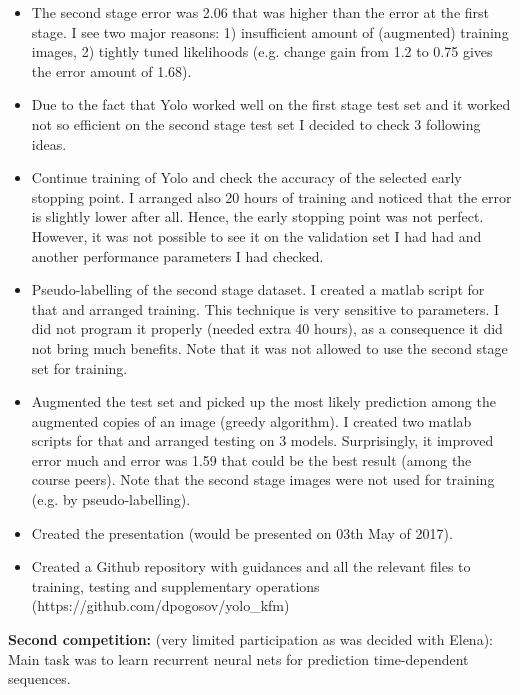 \documentclass[a4paper]{article}
\begin{document}
\begin{itemize}
	\item The second stage error was 2.06 that was higher than the error at the first stage. I see two major reasons: 1) insufficient amount of (augmented) training images, 2) tightly tuned likelihoods (e.g. change gain from 1.2 to 0.75 gives the error amount of 1.68).
	\item Due to the fact that Yolo worked well on the first stage test set and it worked not so efficient on the second stage test set I decided to check 3 following ideas.
	\item Continue training of Yolo and check the accuracy of the selected early stopping point. I arranged also 20 hours of training and noticed that the error is slightly lower after all. Hence, the early stopping point was not perfect. However, it was not possible to see it on the validation set I had had and another performance parameters I had checked.
	\item Pseudo-labelling of the second stage dataset. I created a matlab script for that and arranged training. This technique is very sensitive to parameters. I did not program it properly (needed extra 40 hours), as a consequence it did not bring much benefits. Note that it was not allowed to use the second stage set for training.
	\item Augmented the test set and picked up the most likely prediction among the augmented copies of an image (greedy algorithm). I created two matlab scripts for that and arranged testing on 3 models. Surprisingly, it improved error much and error was 1.59 that could be the best result (among the course peers). Note that the second stage images were not used for training (e.g. by pseudo-labelling).
	\item Created the presentation (would be presented on 03th May of 2017).
	\item Created a Github repository with guidances and all the relevant files to training, testing and  supplementary operations (https://github.com/dpogosov/yolo\_kfm)
	
\end{itemize}

	
\noindent\textbf{Second competition:} (very limited participation as was decided with Elena):\\

Main task was to learn recurrent neural nets for prediction time-dependent sequences.
\end{document}
